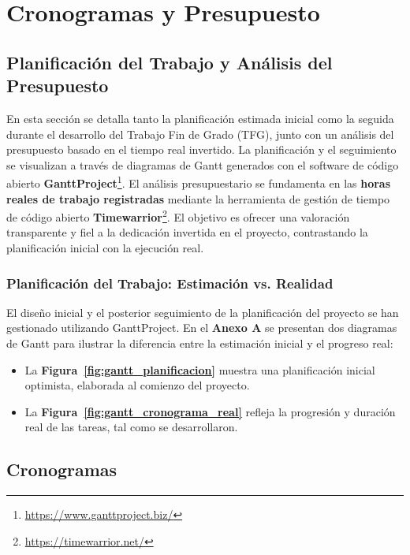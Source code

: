\chapter{Cronogramas y Presupuesto} %
\section{Planificación del Trabajo y Análisis del Presupuesto}
\label{sec:planificacion_presupuesto_intro} %
\glsresetall

En esta sección se detalla tanto la planificación estimada inicial como la seguida durante el desarrollo del Trabajo Fin de Grado (TFG), junto con un análisis del presupuesto basado en el tiempo real invertido. La planificación y el seguimiento se visualizan a través de diagramas de Gantt generados con el software de código abierto \textbf{GanttProject}\footnote{\url{https://www.ganttproject.biz/}}. El análisis presupuestario se fundamenta en las \textbf{horas reales de trabajo registradas} mediante la herramienta de gestión de tiempo de código abierto \textbf{Timewarrior}\footnote{\url{https://timewarrior.net/}}. El objetivo es ofrecer una valoración transparente y fiel a la dedicación invertida en el proyecto, contrastando la planificación inicial con la ejecución real.

\subsection{Planificación del Trabajo: Estimación vs. Realidad}

El diseño inicial y el posterior seguimiento de la planificación del proyecto se han gestionado utilizando GanttProject. En el \textbf{Anexo A} se presentan dos diagramas de Gantt para ilustrar la diferencia entre la estimación inicial y el progreso real:
\begin{itemize}
    \item La \textbf{Figura~\ref{fig:gantt_planificacion}} muestra una planificación inicial optimista, elaborada al comienzo del proyecto.
    \item La \textbf{Figura~\ref{fig:gantt_cronograma_real}} refleja la progresión y duración real de las tareas, tal como se desarrollaron.
\end{itemize}

\newpage
\section{Cronogramas}

